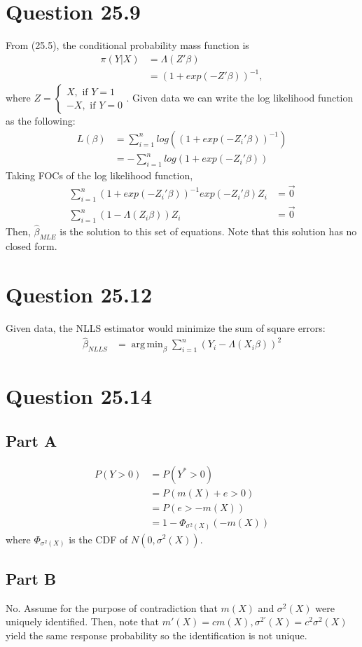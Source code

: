 \documentclass[11pt]{article} %
\DeclareMathOperator*{\argmin}{arg\,min}
\begin{document}
\section{Question 25.9}
From (25.5), the conditional probability mass function is
\begin{align*}
\pi(Y|X) &= \Lambda(Z'\beta)\\
&= (1+exp(-Z'\beta))^{-1},
\end{align*}
where $Z = \begin{cases} X, \text{ if } Y=1 \\ -X, \text{ if } Y=0 \end{cases}$. Given data we can write the log likelihood function as the following:
\begin{align*}
L(\beta) &= \sum_{i=1}^n log((1+exp(-Z_i'\beta))^{-1}) \\\
&= -\sum_{i=1}^n log(1+exp(-Z_i'\beta))
\end{align*}
Taking FOCs of the log likelihood function,
\begin{align*}
\sum_{i=1}^n (1+exp(-Z_i'\beta))^{-1}exp(-Z_i'\beta)Z_i &= \vec{0}\\
\sum_{i=1}^n (1-\Lambda(Z_i\beta))Z_i &= \vec{0}
\end{align*}
Then, $\hat{\beta}_{MLE}$ is the solution to this set of equations. Note that this solution has no closed form.
\section{Question 25.12}
Given data, the NLLS estimator would minimize the sum of square errors:
\begin{align*}
\hat{\beta}_{NLLS} &= \argmin_{\beta} \sum_{i=1}^n (Y_i - \Lambda(X_i \beta))^2
\end{align*}
\section{Question 25.14}
\subsection{Part A}
\begin{align*}
P(Y>0) &= P(Y^{*}>0)\\
&= P(m(X) + e >0)\\
&= P(e>-m(X))\\
&= 1-\Phi_{\sigma^2(X)}(-m(X))
\end{align*}
where $\Phi_{\sigma^2(X)}$ is the CDF of $N(0,\sigma^2(X))$.
\subsection{Part B}
No. Assume for the purpose of contradiction that $m(X)$ and $\sigma^2(X)$ were uniquely identified. Then, note that $m'(X) = cm(X), \sigma^{2'}(X) = c^2\sigma^2(X)$  yield the same response probability so the identification is not unique.
\end{document}
